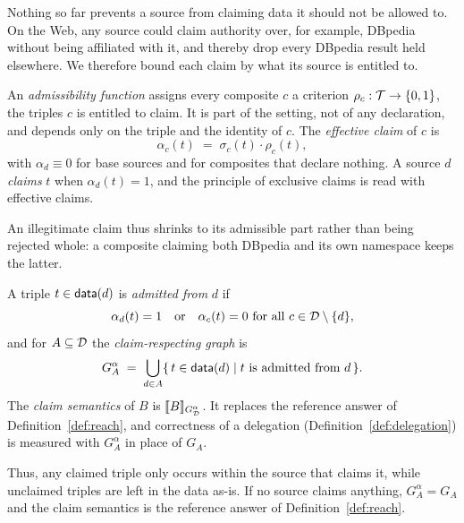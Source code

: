 Nothing so far prevents a source from claiming data it should not be allowed to. 
On the Web, any source could claim authority over, for example, DBpedia without being
affiliated with it, and thereby drop every DBpedia result held elsewhere. We
therefore bound each claim by what its source is entitled to.

\begin{definition}
\label{def:admissible}
An \emph{admissibility function} assigns every composite $c$ a criterion
$\rho_c : \mathcal{T} \to \{0,1\}$, the triples $c$ is entitled to claim. It is part of the
setting, not of any declaration, and depends only on the triple and the identity of $c$.
The \emph{effective claim} of $c$ is
\[
  \alpha_c(t) \;=\; \sigma_c(t) \cdot \rho_c(t),
\]
with $\alpha_d \equiv 0$ for base sources and for composites that declare nothing. A
source $d$ \emph{claims} $t$ when $\alpha_d(t) = 1$, and the principle of exclusive claims
is read with effective claims.
\end{definition}

An illegitimate claim thus shrinks to its admissible part rather than being rejected
whole: a composite claiming both DBpedia and its own namespace keeps the latter.

\begin{definition}
\label{def:claim-semantics}
A triple $t \in \mathsf{data}(d)$ is \emph{admitted from} $d$ if
\begin{equation}
  \label{eq:admitted}
  \alpha_d(t) = 1 \quad\text{or}\quad \alpha_c(t) = 0 \text{ for all } c \in \mathcal{D} \setminus \{d\},
\end{equation}
and for $A \subseteq \mathcal{D}$ the \emph{claim-respecting graph} is
\[
  G^{\alpha}_A \;=\; \bigcup_{d \in A}
  \{\, t \in \mathsf{data}(d) \mid t \text{ is admitted from } d \,\}.
\]
The
\emph{claim semantics} of $B$ is $\llbracket B \rrbracket_{G^{\alpha}_{\mathcal{D}}}$. It replaces the reference
answer of Definition~\ref{def:reach}, and correctness of a delegation
(Definition~\ref{def:delegation}) is measured with $G^{\alpha}_A$ in place of $G_A$.
\end{definition}

Thus, any claimed triple only occurs within the source that claims it, while unclaimed
triples are left in the data as-is. If no source claims
anything, $G^{\alpha}_A = G_A$ and the claim semantics is the reference answer of
Definition~\ref{def:reach}.


